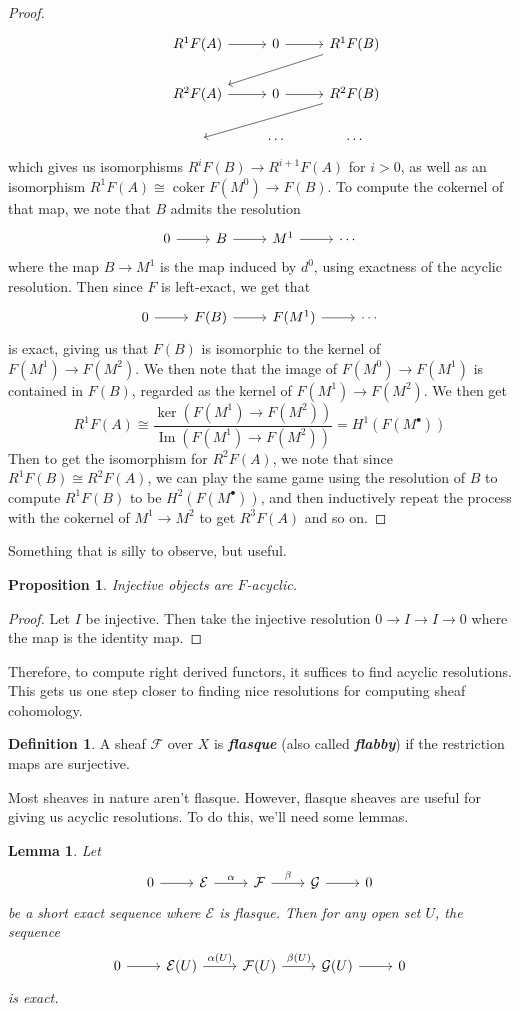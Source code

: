 \documentclass[psamsfonts, 12pt]{amsart}
\newtheorem{prop}[thm]{Proposition}
\newtheorem{lem}[thm]{Lemma}
\theoremstyle{definition}
\newtheorem{defn}[thm]{Definition}
\theoremstyle{remark}
\newcommand{\ib}[1]{\textbf{\textit{#1}}}
\DeclareMathOperator{\im}{Im}
\DeclareMathOperator{\coker}{coker}
\begin{document}
\begin{proof}
\[\begin{tikzcd}
& R^1F(A) \ar[r] & 0 \ar[r] & R^1F(B) \ar[dll] \\
& R^2F(A) \ar[r] & 0 \ar[r] & R^2F(B) \ar[dll] \\
& ~ & \cdots & \cdots
\end{tikzcd}\]
which gives us isomorphisms $R^iF(B) \to R^{i+1}F(A)$ for $i > 0$, as well as
an isomorphism $R^1F(A) \cong \coker F(M^0) \to F(B)$. To compute the
cokernel of that map, we note that $B$ admits the resolution
\[\begin{tikzcd}
0 \ar[r] & B \ar[r] & M^1 \ar[r] & \cdots
\end{tikzcd}\]
where the map $B \to M^1$ is the map induced by $d^0$, using exactness of the acyclic
resolution. Then since $F$ is left-exact, we get that
\[\begin{tikzcd}
0 \ar[r] & F(B) \ar[r] & F(M^1) \ar[r] & \cdots
\end{tikzcd}\]
is exact, giving us that $F(B)$ is isomorphic to the kernel of $F(M^1) \to F(M^2)$. We
then note that the image of $F(M^0) \to F(M^1)$ is contained in $F(B)$, regarded
as the kernel of $F(M^1) \to F(M^2)$. We then get
\[
R^1F(A) \cong \frac{\ker(F(M^1) \to F(M^2))}{\im(F(M^1) \to F(M^2))}
= H^1(F(M^\bullet))
\]
Then to get the isomorphism for $R^2F(A)$, we note that since
$R^1F(B) \cong R^2F(A)$, we can play the same game using the resolution of $B$
to compute $R^1F(B)$ to be $H^2(F(M^\bullet))$, and then inductively repeat
the process with the cokernel of $M^1 \to M^2$ to get $R^3F(A)$ and so on.
\end{proof}
%
Something that is silly to observe, but useful.
%
\begin{prop}
Injective objects are $F$-acyclic.
\end{prop}
%
\begin{proof}
Let $I$ be injective. Then take the injective resolution $0 \to I \to I \to 0$
where the map is the identity map.
\end{proof}
%
Therefore, to compute right derived functors, it suffices to find acyclic resolutions.
This gets us one step closer to finding nice resolutions for computing sheaf cohomology.
%
\begin{defn}
A sheaf $\mathcal{F}$ over $X$ is \ib{flasque} (also called \ib{flabby}) if
the restriction maps are surjective.
\end{defn}
%
Most sheaves in nature aren't flasque. However, flasque sheaves are useful for giving
us acyclic resolutions. To do this, we'll need some lemmas.
%
\begin{lem}
Let
\[\begin{tikzcd}
0 \ar[r] & \mathcal{E} \ar[r, "\alpha"] & \mathcal{F} \ar[r,"\beta"]
& \mathcal{G} \ar[r] & 0
\end{tikzcd}\]
be a short exact sequence where $\mathcal{E}$ is flasque. Then for any open set $U$,
the sequence
\[\begin{tikzcd}
0 \ar[r] & \mathcal{E}(U) \ar[r, "\alpha(U)"] & \mathcal{F}(U) \ar[r, "\beta(U)"]
& \mathcal{G}(U) \ar[r] & 0
\end{tikzcd}\]
is exact.
\end{lem}
\end{document}
